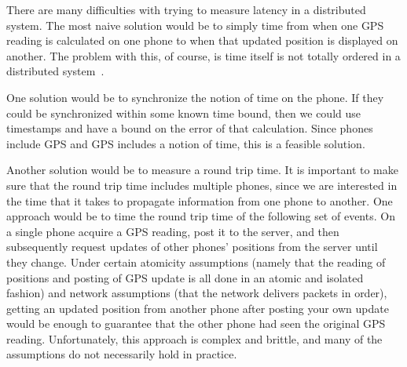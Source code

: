 \documentclass{acm_proc_article-sp}
\begin{document}
There are many difficulties with trying to measure latency in a distributed system.  The most naive solution would be to simply time from when one GPS reading is calculated on one phone to when that updated position is displayed on another. The problem with this, of course, is time itself is not totally ordered in a distributed system~\cite{Lamport:1978:TCO}.

One solution would be to synchronize the notion of time on the phone.  If they could be synchronized within some known time bound, then we could use timestamps and have a bound on the error of that calculation.  Since phones include GPS and GPS includes a notion of time, this is a feasible solution.

Another solution would be to measure a round trip time.  It is important to make sure that the round trip time includes multiple phones, since we are interested in the time that it takes to propagate information from one phone to another.  One approach would be to time the round trip time of the following set of events.  On a single phone acquire a GPS reading, post it to the server, and then subsequently request updates of other phones' positions from the server until they change.  Under certain atomicity assumptions (namely that the reading of positions and posting of GPS update is all done in an atomic and isolated fashion) and network assumptions (that the network delivers packets in order), getting an updated position from another phone after posting your own update would be enough to guarantee that the other phone had seen the original GPS reading.  Unfortunately, this approach is complex and brittle, and many of the assumptions do not necessarily hold in practice.
\end{document}
